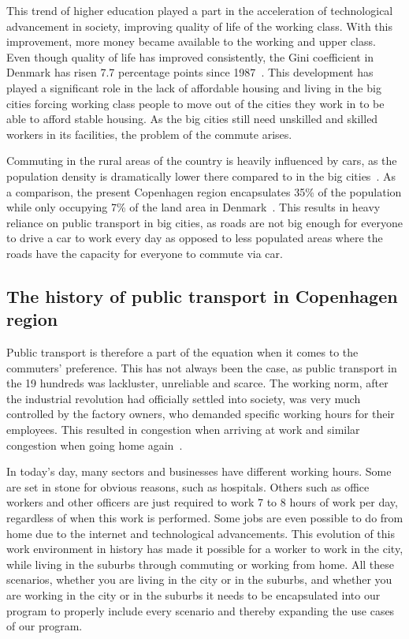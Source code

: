 This trend of higher education played a part in the acceleration of technological advancement in society, improving
quality of life of the working class.
With this improvement, more money became available to the working and upper class.
Even though quality of life has improved consistently, the Gini coefficient in Denmark has risen 7.7 percentage points
since 1987~\cite{cepos2023}.
This development has played a significant role in the lack of affordable housing and living in the big cities forcing
working class people to move out of the cities they work in to be able to afford stable housing.
As the big cities still need unskilled and skilled workers in its facilities, the problem of the commute arises.

Commuting in the rural areas of the country is heavily influenced by cars, as the population density is dramatically
lower there compared to in the big cities~\cite{mulacic2020}.
As a comparison, the present Copenhagen region encapsulates 35\% of the
population while only occupying 7\% of the land area in Denmark~\cite{nielsen&lemberg2017}.
This results in heavy reliance on public transport in big cities, as roads are not big enough for everyone to drive a
car to work every day as opposed to less populated areas where the roads have the capacity for everyone to commute via
car.

\subsection{The history of public transport in Copenhagen region}
\label{subsec:the-history-of-public-transport-in-copenhagen-region}

Public transport is therefore a part of the equation when it comes to the commuters' preference.
This has not always been the case, as public transport in the 19 hundreds was lackluster, unreliable and scarce.
The working norm, after the industrial revolution had officially settled into society, was very much controlled by the
factory owners, who demanded specific working hours for their employees.
This resulted in congestion when arriving at work and similar congestion when going home again~\cite{bek2022}.

In today's day, many sectors and businesses have different working hours.
Some are set in stone for obvious reasons, such as hospitals.
Others such as office workers and other officers are just required to work 7 to 8 hours of work per day, regardless of
when this work is performed.
Some jobs are even possible to do from home due to the internet and technological advancements.
This evolution of this work environment in history has made it possible for a worker to work in the city, while living
in the suburbs through commuting or working from home.
All these scenarios, whether you are living in the city or in the suburbs, and whether you are working in the city or
in the suburbs it needs to be encapsulated into our program to properly include every scenario and thereby expanding the
use cases of our program.
